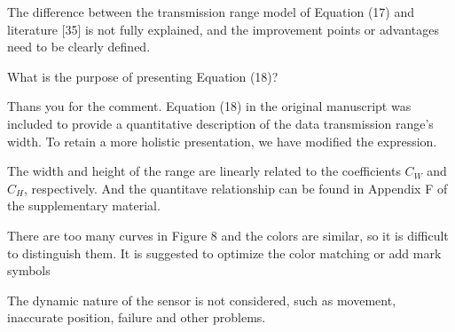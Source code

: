 \begin{revcomment}
	The difference between the transmission range model of Equation (17) and literature [35] is not fully explained, and the improvement points or advantages need to be clearly defined.
\end{revcomment}
\begin{revresponse}
	
\end{revresponse}

\begin{revcomment}
	What is the purpose of presenting Equation (18)?
\end{revcomment}
\begin{revresponse}
	Thans you for the comment.
	Equation (18) in the original manuscript was included to provide a quantitative description of the data transmission range's width.
	To retain a more holistic presentation, we have modified the expression.
	\begin{changes}
		The width and height of the range are linearly related to the coefficients $C_W$ and $C_H$, respectively.
		And the quantitave relationship can be found in Appendix F of the supplementary material.
	\end{changes}
\end{revresponse}

\begin{revcomment}
	There are too many curves in Figure 8 and the colors are similar, so it is difficult to distinguish them. It is suggested to optimize the color matching or add mark symbols
\end{revcomment}
\begin{revresponse}
	
\end{revresponse}

\begin{revcomment}
	The dynamic nature of the sensor is not considered, such as movement, inaccurate position, failure and other problems.
\end{revcomment}
\begin{revresponse}
	
\end{revresponse}

